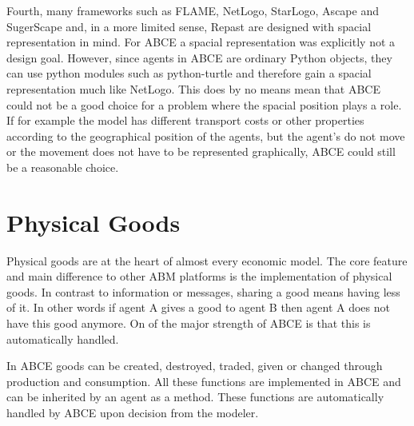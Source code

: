 \documentclass[letterpaper,10pt,english]{sphinxmanual}
\begin{document}
Fourth, many frameworks such as FLAME, NetLogo, StarLogo, Ascape
and SugerScape and, in a
more limited sense, Repast are designed with spacial representation in mind.
For ABCE a spacial representation was explicitly not a design goal.
However, since agents in ABCE are ordinary Python objects, they can use
python modules such as python-turtle and therefore gain a spacial
representation much like NetLogo. This does by no means mean that
ABCE could not be a good choice for a problem where the spacial
position plays a role. If for example the model has different
transport costs or other properties according to the geographical
position of the agents, but the agent's do not move or the movement
does not have to be represented graphically, ABCE could still be a
reasonable choice.


\section{Physical Goods}
\label{introduction:physical-goods}
Physical goods are at the heart of almost every economic model.
The core feature and main difference to other ABM platforms is the
implementation of physical goods. In contrast
to information or messages, sharing a good means having less of it. In other
words if agent A gives a good to agent B then agent A does not have this good
anymore. On of the major strength of ABCE is that this is automatically handled.

In ABCE goods can be created, destroyed, traded, given or changed through
production and consumption. All these functions are implemented in ABCE and
can be inherited by an agent as a method. These functions are automatically handled by
ABCE upon decision from the modeler.
\end{document}
